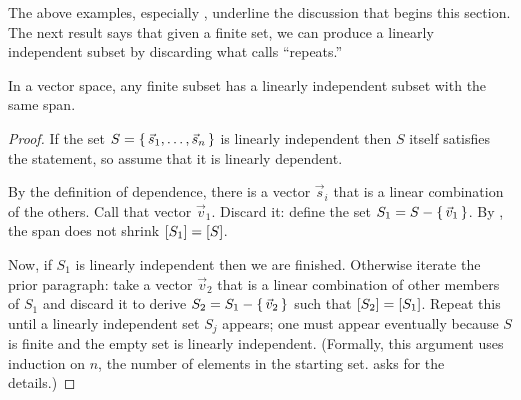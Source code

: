 The above examples, especially ,
underline the discussion that begins this section.
The next result 
says that given a finite set,
we can produce a linearly independent subset
by discarding what 
calls ``repeats.''


\begin{theorem}
\label{th:AlwaysAnLDSubset}
In a vector space,
any finite subset has a linearly independent subset with the same span.
\end{theorem}

\begin{proof}
If the set  \( S=\mbox{$\{\, \vec{s}_1,\dots,\vec{s}_n\,\}$} \) is linearly independent
then $S$ itself satisfies the statement, so 
assume that it is linearly dependent.

By the definition of dependence,
there is a vector \( \vec{s}_i \) that is a linear combination of
the others.
Call that vector \( \vec{v}_1 \).
Discard it:
define the set \( S_1=S-\mbox{$\{\,\vec{v}_1\,\}$} \).
By , the span does not
shrink \( \relax [S_1\relax ]=\relax [S\relax ] \).

Now, if \( S_1 \) is linearly independent then we are finished.
Otherwise iterate the prior paragraph: 
take a vector $\vec{v}_2$ 
that is a linear combination of
other members of $S_1$ and discard it
to derive \( S_2=S_1-\mbox{$\{\,\vec{v}_2\,\}$} \)
such that \( \relax [S_2\relax ]=\relax [S_1\relax ] \).
Repeat this until a linearly independent set $S_j$ appears;
one must appear eventually because \( S \) is finite
and the empty set is linearly independent.
(Formally, this argument uses
induction on $n$, the number of elements in the starting set.
 asks for the details.)
\end{proof}

